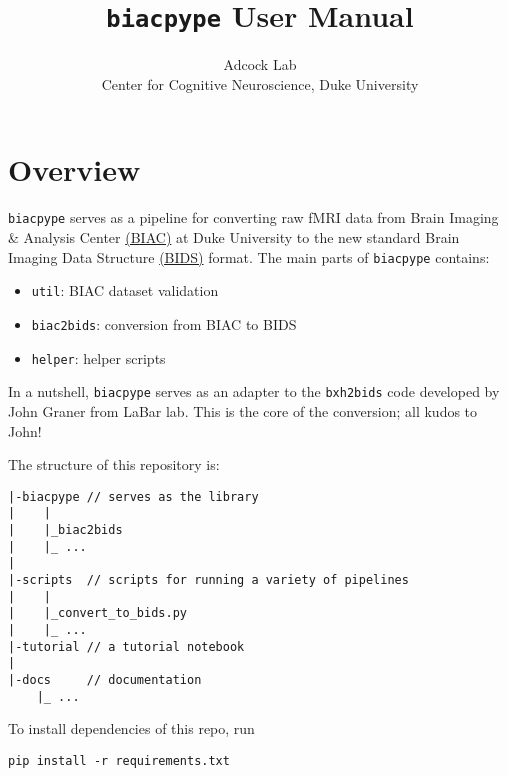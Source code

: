 \documentclass[12pt]{myland}
\def\<#1>{\texttt{#1}}
\begin{document}
\title{\texttt{biacpype} User Manual}
\author{\small{Adcock Lab} \\ \small{Center for Cognitive Neuroscience, Duke University}}
\maketitle
\tableofcontents
\newpage

\section{Overview}

    \texttt{biacpype} serves as a pipeline for converting raw fMRI data from Brain Imaging \& Analysis Center
    \href{https://www.biac.duke.edu/}{(BIAC)} at Duke University to the new standard Brain Imaging Data Structure
    \href{http://bids.neuroimaging.io/}{(BIDS)} format. The main parts of \texttt{biacpype} contains:

    \begin{itemize}
        \item \texttt{util}: BIAC dataset validation
        \item \texttt{biac2bids}: conversion from BIAC to BIDS
        \item \texttt{helper}: helper scripts
    \end{itemize}

    In a nutshell, \<biacpype> serves as an adapter to the \<bxh2bids> code developed by John Graner from LaBar 
    lab. This is the core of the conversion; all kudos to John!

    The structure of this repository is: \par \vspace{.2in}

    \begin{lstlisting}
|-biacpype // serves as the library
|    |
|    |_biac2bids
|    |_ ...
|
|-scripts  // scripts for running a variety of pipelines
|    |
|    |_convert_to_bids.py
|    |_ ...
|-tutorial // a tutorial notebook
|
|-docs     // documentation 
    |_ ...
    \end{lstlisting}

    To install dependencies of this repo, run
    \begin{lstlisting}[xleftmargin=.25\textwidth, xrightmargin=.25\textwidth, backgroundcolor=\color{lightgray}, framexleftmargin=1em, framexrightmargin=1em]
    pip install -r requirements.txt
    \end{lstlisting}        
\end{document}
